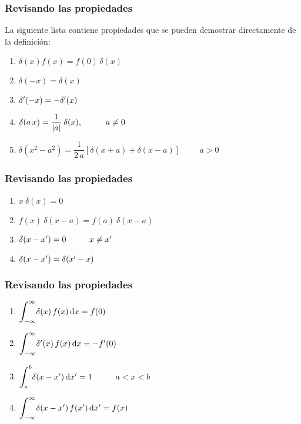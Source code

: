 \documentclass[12pt]{beamer}
\begin{document}
\begin{frame}
\frametitle{Revisando las propiedades}
La siguiente lista contiene propiedades que se pueden demostrar directamente de la definición:
\pause
{}
\begin{enumerate}[<+->]
\item $\delta (x) f (x) = f (0) \, \delta (x)$
\item $\delta (-x) = \delta (x)$
\item ${\delta}^{\prime} (- x) = - {\delta}^{\prime} (x)$
\item $\delta(a \, x) = \dfrac{1}{\abs{a}} \: \delta (x), \hspace{1cm} a \neq 0$
\item $\delta (x^{2} - a^{2}) = \dfrac{1}{2 \, a} \left[ \delta (x + a) + \delta (x - a) \right] \hspace{1cm} a > 0$
\seti
\end{enumerate}
\end{frame}

\begin{frame}
\frametitle{Revisando las propiedades}
\begin{enumerate}[<+->]
\conti
\item $x \: \delta(x) = 0$
\item $f (x) \: \delta(x - a) = f(a) \: \delta(x - a)$
\item $\delta (x - {x}^{\prime}) = 0 \hspace{1cm} x \neq {x}^{\prime}$
\item $\delta (x - {x}^{\prime}) = \delta ({x}^{\prime} - x)$
\seti
\end{enumerate}
\end{frame}

\begin{frame}
\frametitle{Revisando las propiedades}
\begin{enumerate}[<+->]
\conti
\item $\scaleint{6ex}_{\bs -\infty}^{\infty} \delta (x) \, f (x) \dd{x} = f (0)$
\item $\scaleint{6ex}_{\bs -\infty}^{\infty} \pderivada{\delta} (x) \, f (x) \dd{x} = - \pderivada{f} (0)$
\item $\scaleint{6ex}_{\bs a}^{b} \delta (x - \pderivada{x}) \dd{\pderivada{x}} = 1 \hspace{1cm} a < x < b$
\item $\scaleint{6ex}_{\bs -\infty}^{\infty} \delta (x - \pderivada{x}) \, f (\pderivada{x}) \dd{\pderivada{x}} = f (x)$
\seti
\end{enumerate}
\end{frame}
\end{document}
